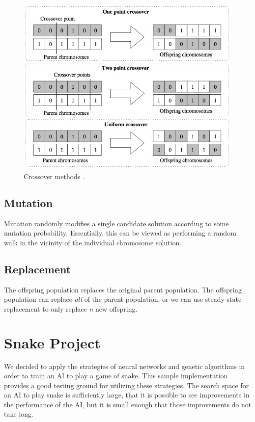 \documentclass{amsart}
\begin{document}
\begin{figure}[htpb]
  \includegraphics[scale=.8]{crossover.png}
  \caption{Crossover methods \cite{genetic}.}
  \label{fig:crossover}
\end{figure}

\subsection{Mutation}

Mutation randomly modifies a single candidate solution according to some
mutation probability. Essentially, this can be viewed as performing a random
walk in the vicinity of the individual chromosome solution.

\subsection{Replacement}

The offspring population replaces the original parent population. The offspring
population can replace \textit{all} of the parent population, or we can use
steady-state replacement to only replace \textit{n} new offspring.

\section{Snake Project} \label{section_snake}

We decided to apply the strategies of neural networks and genetic algorithms in
order to train an AI to play a game of snake. This sample implementation
provides a good testing ground for utilizing these strategies. The search space
for an AI to play snake is sufficiently large, that it is possible to see
improvements in the performance of the AI, but it is small enough that those
improvements do not take long.
\end{document}
